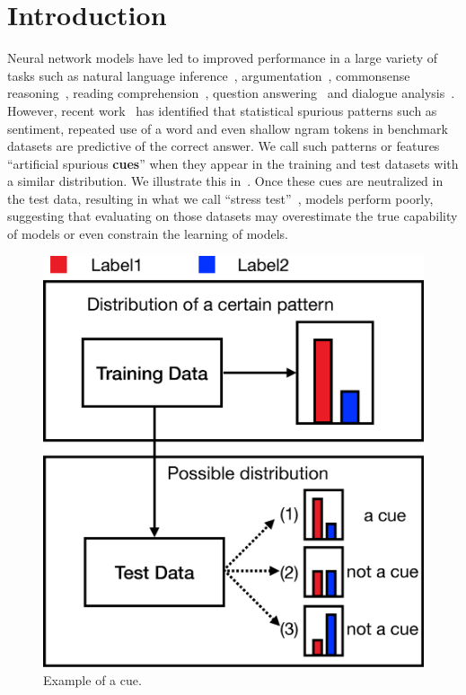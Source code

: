 \section{Introduction}
\label{sec:intro}
Neural network models have led to improved performance 
in a large variety of tasks
such as natural language inference~\cite{bowman2015large,wang2018glue}, 
argumentation~\cite{niven2019probing}, commonsense
reasoning~\cite{mostafazadeh2016corpus,roemmele2011choice,zellers2018swag}, 
reading comprehension~\cite{lai2017race}, question answering~\cite{talmor2019commonsenseqa} 
and dialogue analysis~\cite{lowe2015ubuntu}. 
However, recent work~\cite{gururangan2018annotation,sanchez2018behavior,poliak2018hypothesis}
has identified that statistical spurious patterns such as sentiment, repeated use of
a word and even shallow ngram tokens in benchmark datasets 
are predictive of the correct answer. 
We call such patterns or features ``artificial spurious \textbf{cues}'' when
they appear in the training and test datasets with a similar distribution.
We illustrate this in~. 
Once these cues are neutralized in 
the test data, resulting in what we call 
``stress test''~\cite{naik2018stress,mccoy2019right}, 
models perform poorly, suggesting 
that evaluating on those datasets may overestimate the true capability of 
models or even constrain the learning  of models. 

\begin{figure}[th]
\centering
\includegraphics[width=0.6\columnwidth]{picture/cue_def.eps}
\caption{Example of a cue.}
\label{fig:cue_def}
\end{figure}

